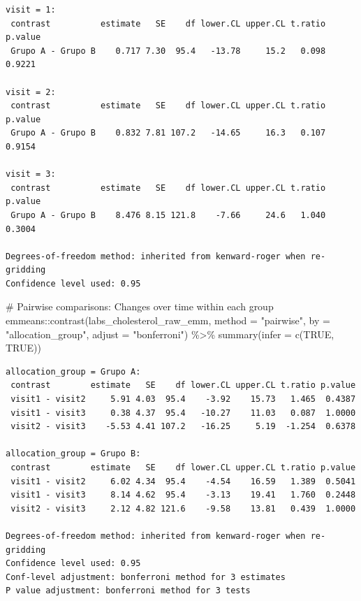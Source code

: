 \documentclass[
  12pt,
]{article}
\newenvironment{Shaded}{\begin{snugshade}}{\end{snugshade}}
\newcommand{\AttributeTok}[1]{\textcolor[rgb]{0.40,0.45,0.13}{#1}}
\newcommand{\CommentTok}[1]{\textcolor[rgb]{0.37,0.37,0.37}{#1}}
\newcommand{\ConstantTok}[1]{\textcolor[rgb]{0.56,0.35,0.01}{#1}}
\newcommand{\FunctionTok}[1]{\textcolor[rgb]{0.28,0.35,0.67}{#1}}
\newcommand{\NormalTok}[1]{\textcolor[rgb]{0.00,0.23,0.31}{#1}}
\newcommand{\SpecialCharTok}[1]{\textcolor[rgb]{0.37,0.37,0.37}{#1}}
\newcommand{\StringTok}[1]{\textcolor[rgb]{0.13,0.47,0.30}{#1}}
\begin{document}
\begin{verbatim}
visit = 1:
 contrast          estimate   SE    df lower.CL upper.CL t.ratio p.value
 Grupo A - Grupo B    0.717 7.30  95.4   -13.78     15.2   0.098  0.9221

visit = 2:
 contrast          estimate   SE    df lower.CL upper.CL t.ratio p.value
 Grupo A - Grupo B    0.832 7.81 107.2   -14.65     16.3   0.107  0.9154

visit = 3:
 contrast          estimate   SE    df lower.CL upper.CL t.ratio p.value
 Grupo A - Grupo B    8.476 8.15 121.8    -7.66     24.6   1.040  0.3004

Degrees-of-freedom method: inherited from kenward-roger when re-gridding 
Confidence level used: 0.95 
\end{verbatim}

\begin{Shaded}
\begin{Highlighting}[]
\CommentTok{\# Pairwise comparisons: Changes over time within each group}
\NormalTok{emmeans}\SpecialCharTok{::}\FunctionTok{contrast}\NormalTok{(labs\_cholesterol\_raw\_emm,}
\AttributeTok{method =} \StringTok{"pairwise"}\NormalTok{, }\AttributeTok{by =} \StringTok{"allocation\_group"}\NormalTok{,}
\AttributeTok{adjust =} \StringTok{"bonferroni"}\NormalTok{) }\SpecialCharTok{\%\textgreater{}\%} \FunctionTok{summary}\NormalTok{(}\AttributeTok{infer =} \FunctionTok{c}\NormalTok{(}\ConstantTok{TRUE}\NormalTok{, }\ConstantTok{TRUE}\NormalTok{))}
\end{Highlighting}
\end{Shaded}

\begin{verbatim}
allocation_group = Grupo A:
 contrast        estimate   SE    df lower.CL upper.CL t.ratio p.value
 visit1 - visit2     5.91 4.03  95.4    -3.92    15.73   1.465  0.4387
 visit1 - visit3     0.38 4.37  95.4   -10.27    11.03   0.087  1.0000
 visit2 - visit3    -5.53 4.41 107.2   -16.25     5.19  -1.254  0.6378

allocation_group = Grupo B:
 contrast        estimate   SE    df lower.CL upper.CL t.ratio p.value
 visit1 - visit2     6.02 4.34  95.4    -4.54    16.59   1.389  0.5041
 visit1 - visit3     8.14 4.62  95.4    -3.13    19.41   1.760  0.2448
 visit2 - visit3     2.12 4.82 121.6    -9.58    13.81   0.439  1.0000

Degrees-of-freedom method: inherited from kenward-roger when re-gridding 
Confidence level used: 0.95 
Conf-level adjustment: bonferroni method for 3 estimates 
P value adjustment: bonferroni method for 3 tests 
\end{verbatim}
\end{document}
